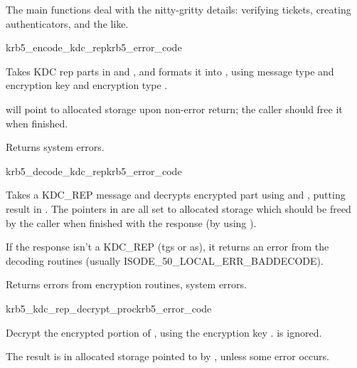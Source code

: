 The main functions deal with the nitty-gritty details: verifying
tickets, creating authenticators, and the like.

\begin{funcdecl}{krb5_encode_kdc_rep}{krb5_error_code}{\funcin}
\funcinout
{}
\funcout
{}
\end{funcdecl}

Takes KDC rep parts in  and , and
formats it into , using message type 
and encryption key  and encryption type
.

 will point to  allocated storage upon
non-error return; the caller should free it when finished.

Returns system errors.

\begin{funcdecl}{krb5_decode_kdc_rep}{krb5_error_code}{\funcin}
\funcout
{}
\end{funcdecl}

Takes a KDC_REP message and decrypts encrypted part using
 and , putting result in .
The pointers in 
are all set to allocated storage which should be freed by the caller
when finished with the response (by using ).


If the response isn't a KDC_REP (tgs or as), it returns an error from
the decoding routines (usually ISODE_50_LOCAL_ERR_BADDECODE).

Returns errors from encryption routines, system errors.

\begin{funcdecl}{krb5_kdc_rep_decrypt_proc}{krb5_error_code}{\funcin}
\funcinout
{}
\end{funcdecl}

Decrypt the encrypted portion of , using the
encryption key .   is ignored.

The result is in allocated storage pointed to by
, unless some error occurs.

